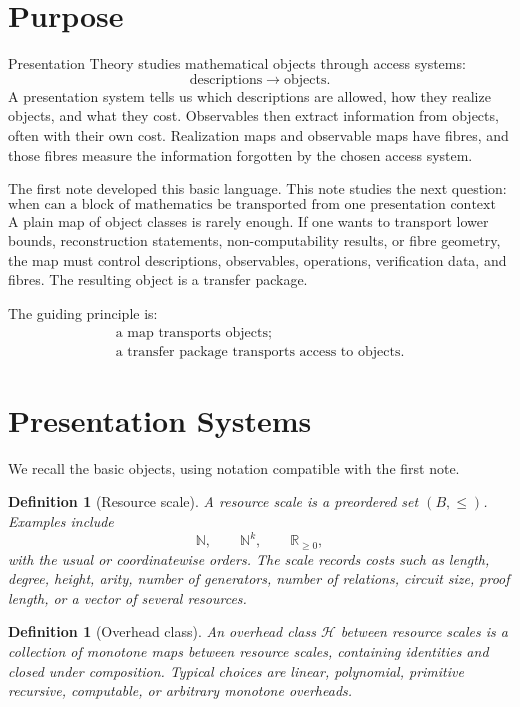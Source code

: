 \documentclass[11pt]{article}
\newtheorem{definition}[theorem]{Definition}
\begin{document}
\section{Purpose}

Presentation Theory studies mathematical objects through access systems:
\[
\text{descriptions}\longrightarrow\text{objects}.
\]
A presentation system tells us which descriptions are allowed, how they realize objects, and what they cost. Observables then extract information from objects, often with their own cost. Realization maps and observable maps have fibres, and those fibres measure the information forgotten by the chosen access system.

The first note developed this basic language. This note studies the next question:
\[
\text{when can a block of mathematics be transported from one presentation context to another?}
\]
A plain map of object classes is rarely enough. If one wants to transport lower bounds, reconstruction statements, non-computability results, or fibre geometry, the map must control descriptions, observables, operations, verification data, and fibres. The resulting object is a transfer package.

The guiding principle is:
\[
\begin{gathered}
\text{a map transports objects;}\\
\text{a transfer package transports access to objects.}
\end{gathered}
\]

\section{Presentation Systems}

We recall the basic objects, using notation compatible with the first note.

\begin{definition}[Resource scale]
A resource scale is a preordered set \((B,\leq)\). Examples include
\[
\mathbb N,\qquad \mathbb N^k,\qquad \mathbb R_{\geq0},
\]
with the usual or coordinatewise orders. The scale records costs such as length, degree, height, arity, number of generators, number of relations, circuit size, proof length, or a vector of several resources.
\end{definition}

\begin{definition}[Overhead class]
An overhead class \(\mathcal H\) between resource scales is a collection of monotone maps between resource scales, containing identities and closed under composition. Typical choices are linear, polynomial, primitive recursive, computable, or arbitrary monotone overheads.
\end{definition}
\end{document}

